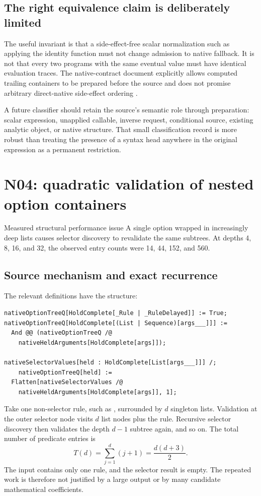 \documentclass[11pt,letterpaper]{article}
\newcommand{\code}[1]{\texttt{\detokenize{#1}}}
\begin{document}
\subsection{The right equivalence claim is deliberately limited}

The useful invariant is that a side-effect-free scalar normalization such as
applying the identity function must not change admission to native fallback.
It is not that every two programs with the same eventual value must have
identical evaluation traces. The native-contract document explicitly allows
computed trailing containers to be prepared before the source and does not
promise arbitrary direct-native side-effect ordering \cite{native-contract}.

A future classifier should retain the source's semantic role through
preparation: scalar expression, unapplied callable, inverse request,
conditional source, existing analytic object, or native structure. That small
classification record is more robust than treating the presence of a syntax
head anywhere in the original expression as a permanent restriction.

\section{N04: quadratic validation of nested option containers}
\begin{findingbox}{Measured structural performance issue}
A single option wrapped in increasingly deep lists causes selector discovery
to revalidate the same subtrees. At depths 4, 8, 16, and 32, the observed
\code{nativeOptionTreeQ} entry counts were 14, 44, 152, and 560.
\end{findingbox}

\subsection{Source mechanism and exact recurrence}

The relevant definitions have the structure:
\begin{lstlisting}
nativeOptionTreeQ[HoldComplete[_Rule | _RuleDelayed]] := True;
nativeOptionTreeQ[HoldComplete[(List | Sequence)[args___]]] :=
  And @@ (nativeOptionTreeQ /@
    nativeHeldArguments[HoldComplete[args]]);

nativeSelectorValues[held : HoldComplete[List[args___]]] /;
    nativeOptionTreeQ[held] :=
  Flatten[nativeSelectorValues /@
    nativeHeldArguments[HoldComplete[args]], 1];
\end{lstlisting}
Take one non-selector rule, such as \code{Assumptions -> True}, surrounded by
$d$ singleton lists. Validation at the outer selector node visits $d$ list
nodes plus the rule. Recursive selector discovery then validates the depth
$d-1$ subtree again, and so on. The total number of predicate entries is
\begin{equation}\label{eq:quadratic}
 T(d)=\sum_{j=1}^{d}(j+1)=\frac{d(d+3)}2.
\end{equation}
The input contains only one rule, and the selector result is empty. The
repeated work is therefore not justified by a large output or by many
candidate mathematical coefficients.
\end{document}
